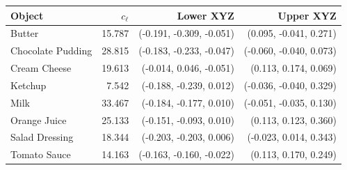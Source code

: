 \begin{tabular}{lrrr}
\toprule
Object & $c_\ell$ & Lower XYZ & Upper XYZ \\
\midrule
Butter & 15.787 & (-0.191, -0.309, -0.051) & (0.095, -0.041, 0.271) \\
Chocolate Pudding & 28.815 & (-0.183, -0.233, -0.047) & (-0.060, -0.040, 0.073) \\
Cream Cheese & 19.613 & (-0.014, 0.046, -0.051) & (0.113, 0.174, 0.069) \\
Ketchup & 7.542 & (-0.188, -0.239, 0.012) & (-0.036, -0.040, 0.329) \\
Milk & 33.467 & (-0.184, -0.177, 0.010) & (-0.051, -0.035, 0.130) \\
Orange Juice & 25.133 & (-0.151, -0.093, 0.010) & (0.113, 0.123, 0.360) \\
Salad Dressing & 18.344 & (-0.203, -0.203, 0.006) & (-0.023, 0.014, 0.343) \\
Tomato Sauce & 14.163 & (-0.163, -0.160, -0.022) & (0.113, 0.170, 0.249) \\
\bottomrule
\end{tabular}
